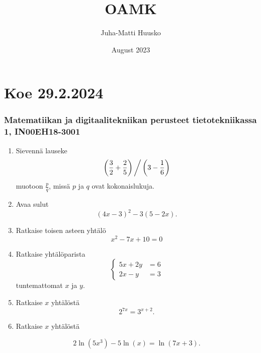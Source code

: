 \documentclass[12pt]{article}
\title{OAMK}
\author{Juha-Matti Huusko}
\date{August 2023}
\renewcommand{\ratkaisu}[1]{{\color{blue}\quad\textrm{Ratkaisu: } #1}}
\renewcommand{\ratkaisu}[1]{}
\begin{document}
\thispagestyle{empty}

\section*{Koe 29.2.2024}
\subsubsection*{Matematiikan ja digitaalitekniikan perusteet tietotekniikassa 1, IN00EH18-3001}

\begin{enumerate}
\item Sievennä lauseke
    $$\left(\frac32+\frac25\right)\bigg/\left(3-\frac16\right)$$\ratkaisu{1/2} %
muotoon $\frac{p}{q}$, missä $p$ ja $q$ ovat kokonaislukuja.

\item Avaa sulut
$$(4x-3)^2-3(5-2x).$$\ratkaisu{$16x^2$} %


\item Ratkaise toisen asteen yhtälö
$$x^2-7x+10=0$$\ratkaisu{$x=-1,x=2$} %

\item Ratkaise yhtälöparista
$$\begin{cases}
5x+2y&=6\\
2x-y&=3
\end{cases}\ratkaisu{$x=2/3, y=-1/3$}
$$
tuntemattomat $x$ ja $y$.

\def\a{2}\def\b{7}\def\c{3}\def\d{2} %


\item Ratkaise $x$ yhtälöstä
$$
\a^{\b x}=\c^{x+\d}.
$$
\ratkaisu{$x=\frac{\d \ln(\c)}{\b \ln(\a)-\ln(\c)}$}

\item Ratkaise $x$ yhtälöstä

$$2\ln(5x^3)-5\ln(x)=\ln(7x+3).$$\ratkaisu{$x=1/6$} %


\end{enumerate}
\end{document}
